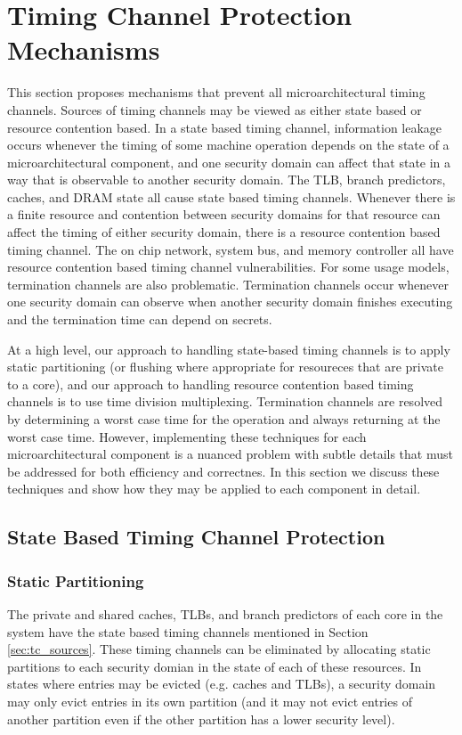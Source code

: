\section{Timing Channel Protection Mechanisms}
This section proposes mechanisms that prevent all microarchitectural timing 
channels. Sources of timing channels may be viewed as either state based or 
resource contention based. In a state based timing channel, information leakage 
occurs whenever the timing of some machine operation depends on the state of a 
microarchitectural component, and one security domain can affect that state in 
a way that is observable to another security domain. The TLB, branch 
predictors, caches, and DRAM state all cause state based timing channels.  
Whenever there is a finite resource and contention between security domains for 
that resource can affect the timing of either security domain, there is a 
resource contention based timing channel. The on chip network, system bus, and 
memory controller all have resource contention based timing channel 
vulnerabilities. For some usage models, termination channels are also 
problematic. Termination channels occur whenever one security domain can 
observe when another security domain finishes executing and the termination 
time can depend on secrets.

At a high level, our approach to handling state-based timing channels is to 
apply static partitioning (or flushing where appropriate for resoureces that 
are private to a core), and our approach to handling resource contention 
based timing channels is to use time division multiplexing.  Termination 
channels are resolved by determining a worst case time for the operation and 
always returning at the worst case time. However, implementing these techniques 
for each microarchitectural component is a nuanced problem with subtle details 
that must be addressed for both efficiency and correctnes. In this section we 
discuss these techniques and show how they may be applied to each component in 
detail.

\subsection{State Based Timing Channel Protection}
\subsubsection{Static Partitioning}
The private and shared caches, TLBs, and branch predictors of each core in the 
system have the state based timing channels mentioned in Section 
\ref{sec:tc_sources}.  These timing channels can be eliminated by allocating 
static partitions to each security domian in the state of each of these 
resources. In states where entries may be evicted (e.g. caches and TLBs), a 
security domain may only evict entries in its own partition (and it may not 
evict entries of another partition even if the other partition has a lower 
security level).


